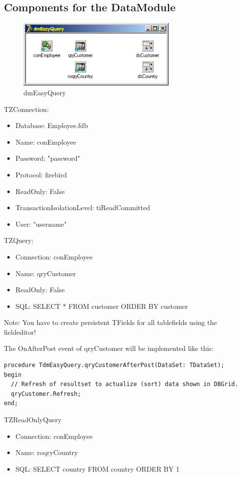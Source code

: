 \documentclass[a4paper,12pt,oneside]{book}
\begin{document}
\subsection{Components for the DataModule}
\begin{figure}[htbp] 
  \centering
  \includegraphics[width=0.7\textwidth]{ZeosTutorial/dmEasyQuery.png}
  \caption{dmEasyQuery}
  \label{fig:dmEasyQuery}
\end{figure}

TZConnection:
\begin{itemize}
  \item Database: Employee.fdb
  \item Name: conEmployee
  \item Password: "password"
  \item Protocol: firebird
  \item ReadOnly: False
  \item TransactionIsolationLevel: tiReadCommitted
  \item User: "username"
\end{itemize}

TZQuery:
\begin{itemize}
  \item Connection: conEmployee
  \item Name: qryCustomer
  \item ReadOnly: False
  \item SQL: SELECT * FROM customer ORDER BY customer
\end{itemize}

Note: You have to create persistent TFields for all tablefields using the fieldeditor!

The OnAfterPost event of qryCustomer will be implemented like this:
\begin{verbatim}
procedure TdmEasyQuery.qryCustomerAfterPost(DataSet: TDataSet);
begin
  // Refresh of resultset to actualize (sort) data shown in DBGrid.
  qryCustomer.Refresh;
end;
\end{verbatim}

TZReadOnlyQuery
\begin{itemize}
  \item Connection: conEmployee
	\item Name: roqryCountry
	\item SQL: SELECT country FROM country ORDER BY 1
\end{itemize}
\end{document}
